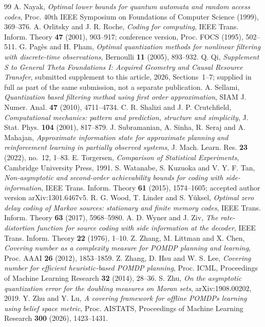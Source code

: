 \begin{thebibliography}{99}
 A. Nayak, \emph{Optimal lower bounds for quantum automata and random access codes}, Proc. 40th IEEE Symposium on Foundations of Computer Science (1999), 369--376.
 A. Orlitsky and J. R. Roche, \emph{Coding for computing}, IEEE Trans. Inform. Theory \textbf{47} (2001), 903--917; conference version, Proc. FOCS (1995), 502--511.
 G. Pag\`es and H. Pham, \emph{Optimal quantization methods for nonlinear filtering with discrete-time observations}, Bernoulli \textbf{11} (2005), 893--932.
 Q. Qi, \emph{Supplement S to General Theta Foundations I: Acquired Geometry and Causal Resource Transfer}, submitted supplement to this article, 2026, Sections~1--7; supplied in full as part of the same submission, not a separate publication.
 A. Sellami, \emph{Quantization based filtering method using first order approximation}, SIAM J. Numer. Anal. \textbf{47} (2010), 4711--4734.
 C. R. Shalizi and J. P. Crutchfield, \emph{Computational mechanics: pattern and prediction, structure and simplicity}, J. Stat. Phys. \textbf{104} (2001), 817--879.
 J. Subramanian, A. Sinha, R. Seraj and A. Mahajan, \emph{Approximate information state for approximate planning and reinforcement learning in partially observed systems}, J. Mach. Learn. Res. \textbf{23} (2022), no.~12, 1--83.
 E. Torgersen, \emph{Comparison of Statistical Experiments}, Cambridge University Press, 1991.
 S. Watanabe, S. Kuzuoka and V. Y. F. Tan, \emph{Non-asymptotic and second-order achievability bounds for coding with side-information}, IEEE Trans. Inform. Theory \textbf{61} (2015), 1574--1605; accepted author version arXiv:1301.6467v5.
 R. G. Wood, T. Linder and S. Y\"uksel, \emph{Optimal zero delay coding of Markov sources: stationary and finite memory codes}, IEEE Trans. Inform. Theory \textbf{63} (2017), 5968--5980.
 A. D. Wyner and J. Ziv, \emph{The rate-distortion function for source coding with side information at the decoder}, IEEE Trans. Inform. Theory \textbf{22} (1976), 1--10.
 Z. Zhang, M. Littman and X. Chen, \emph{Covering number as a complexity measure for POMDP planning and learning}, Proc. AAAI \textbf{26} (2012), 1853--1859.
 Z. Zhang, D. Hsu and W. S. Lee, \emph{Covering number for efficient heuristic-based POMDP planning}, Proc. ICML, Proceedings of Machine Learning Research \textbf{32} (2014), 28--36.
 S. Zhu, \emph{On the asymptotic quantization error for the doubling measures on Moran sets}, arXiv:1908.00202, 2019.
 Y. Zhu and Y. Lu, \emph{A covering framework for offline POMDPs learning using belief space metric}, Proc. AISTATS, Proceedings of Machine Learning Research \textbf{300} (2026), 1423--1431.
\end{thebibliography}

